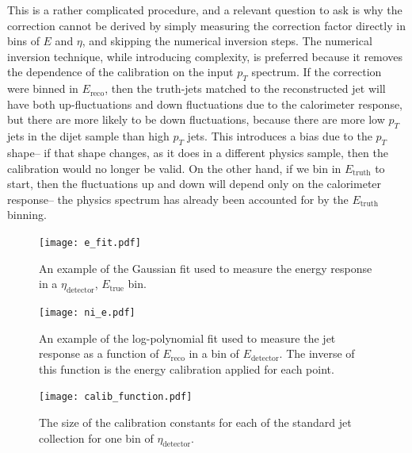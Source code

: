 This is a rather complicated procedure, and a relevant question to ask is why the correction cannot be derived by simply measuring the correction factor directly in bins of $E$ and $\eta$, and skipping the numerical inversion steps. The numerical inversion technique, while introducing complexity, is preferred because it removes the dependence of the calibration on the input $p_T$ spectrum. If the correction were binned in $E_{\mathrm{reco}}$, then the truth-jets matched to the reconstructed jet will have both up-fluctuations and down fluctuations due to the calorimeter response, but there are more likely to be down fluctuations, because there are more low $p_T$ jets in the dijet sample than high $p_T$ jets. This introduces a bias due to the $p_T$ shape-- if that shape changes, as it does in a different physics sample, then the calibration would no longer be valid. On the other hand, if we bin in $E_{\mathrm{truth}}$ to start, then the fluctuations up and down will depend only on the calorimeter response-- the physics spectrum has already been accounted for by the $E_{\mathrm{truth}}$ binning.



\begin{figure}
\centering
\texttt{[image: e\_fit.pdf]}
\label{fig:jet-reconstruction:e-fit}
\caption{An example of the Gaussian fit used to measure the energy response in a $\eta_\mathrm{detector}$, $E_\mathrm{true}$ bin.}
\end{figure}




\begin{figure}
\centering
\texttt{[image: ni\_e.pdf]}
\label{fig:jet-reconstruction:ni-e}
\caption{An example of the log-polynomial fit used to measure the jet response as a function of $E_\mathrm{reco}$ in a bin of $E_\mathrm{detector}$. The inverse of this function is the energy calibration applied for each point.}
\end{figure}



\begin{figure}
\centering
\texttt{[image: calib\_function.pdf]}
\label{fig:jet-reconstruction:calib-function}
\caption{The size of the calibration constants for each of the standard jet collection for one bin of $\eta_\mathrm{detector}$.}
\end{figure}

